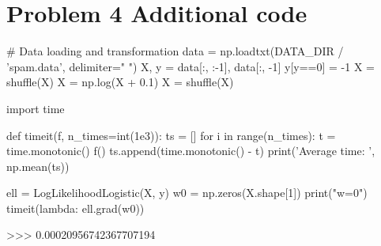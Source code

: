 \documentclass{homework}
\begin{document}
\section{Problem 4 Additional code}

\begin{center}
    \begin{python}
# Data loading and transformation
data = np.loadtxt(DATA_DIR / 'spam.data', delimiter=" ")
X, y = data[:, :-1], data[:, -1]
y[y==0] = -1
X = shuffle(X)
X = np.log(X + 0.1)
X = shuffle(X)

import time

def timeit(f, n_times=int(1e3)):
    ts = []
    for i in range(n_times):
        t = time.monotonic()
        f()
        ts.append(time.monotonic() - t)
    print('Average time: ', np.mean(ts))

ell = LogLikelihoodLogistic(X, y)
w0 = np.zeros(X.shape[1])
print("w=0")
timeit(lambda: ell.grad(w0))

>>> 0.00020956742367707194
    \end{python}
    \label{fig:timing}
\end{center}
\end{document}
